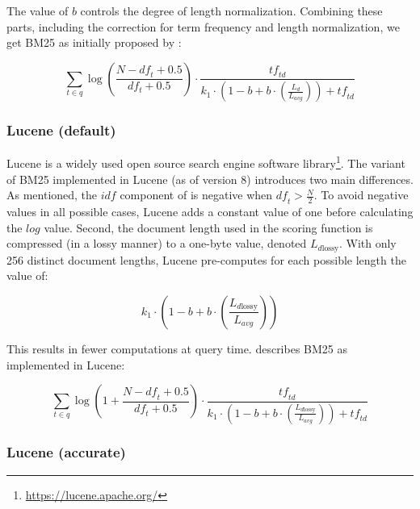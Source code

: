 The value of $b$ controls the degree of length normalization. Combining these parts, including the correction for term frequency and length normalization, we get BM25 as initially proposed by \citet{bm25-robertson}:

\begin{equation}
	\label{bm25-robertson}
	\sum_{t\in q} \log\left(\frac{N-\mathit{df}_t+0.5}{df_t+0.5}\right)\cdot\frac{\mathit{tf}_{\mathit{td}}}{k_1\cdot\left(1-b+b\cdot\left(\frac{L_d}{L_{\mathit{avg}}}\right)\right) + \mathit{tf}_{\mathit{td}}}
\end{equation}

\subsubsection{Lucene (default)}
Lucene is a widely used open source search engine software library\footnote{\url{https://lucene.apache.org/}}. 
The variant of BM25 implemented in Lucene (as of version 8) introduces two main differences. As mentioned, the $\mathit{idf}$ component of \citet{bm25-robertson} is negative when $\mathit{df}_t > \frac{N}{2}$.
To avoid negative values in all possible cases, Lucene adds a constant value of one before calculating the $log$ value. 
Second, the document length used in the scoring function is compressed (in a lossy manner) to a one-byte value, denoted $L_{d\text{lossy}}$. With only 256 distinct document lengths, Lucene pre-computes for each possible length the value of:

\begin{equation}
	k_1 \cdot \left(1-b+b\cdot\left(\frac{L_{d\text{lossy}}}{L_{\mathit{avg}}}\right)\right)
\end{equation}

This results in fewer computations at query time.  describes BM25 as implemented in Lucene:

\begin{equation}
	\label{lucene-default}
	\sum_{t\in q}\log\left(1 + \frac{N-\mathit{df}_t+0.5}{\mathit{df}_t+0.5}\right)\cdot\frac{\mathit{tf}_{\mathit{td}}}{k_1\cdot\left(1-b+b\cdot\left(\frac{L_{d \text{lossy}}}{L_{\mathit{avg}}}\right)\right)+\mathit{tf}_{\mathit{td}}}
\end{equation}

\subsubsection{Lucene (accurate)}

